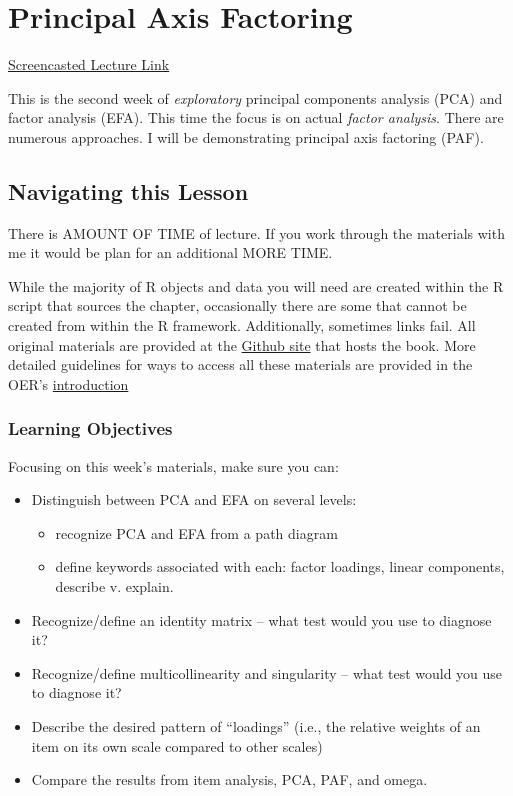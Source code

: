 \documentclass[
  english,
]{book}
\providecommand{\tightlist}{%
  \setlength{\itemsep}{0pt}\setlength{\parskip}{0pt}}
\begin{document}
\hypertarget{PAF}{%
\chapter{Principal Axis Factoring}\label{PAF}}

\href{link}{Screencasted Lecture Link}

This is the second week of \emph{exploratory} principal components analysis (PCA) and factor analysis (EFA). This time the focus is on actual \emph{factor analysis}. There are numerous approaches. I will be demonstrating principal axis factoring (PAF).

\hypertarget{navigating-this-lesson-7}{%
\section{Navigating this Lesson}\label{navigating-this-lesson-7}}

There is AMOUNT OF TIME of lecture. If you work through the materials with me it would be plan for an additional MORE TIME.

While the majority of R objects and data you will need are created within the R script that sources the chapter, occasionally there are some that cannot be created from within the R framework. Additionally, sometimes links fail. All original materials are provided at the \href{https://github.com/lhbikos/ReC_Psychometrics}{Github site} that hosts the book. More detailed guidelines for ways to access all these materials are provided in the OER's \protect\hyperlink{ReCintro}{introduction}

\hypertarget{learning-objectives-7}{%
\subsection{Learning Objectives}\label{learning-objectives-7}}

Focusing on this week's materials, make sure you can:

\begin{itemize}
\tightlist
\item
  Distinguish between PCA and EFA on several levels:

  \begin{itemize}
  \tightlist
  \item
    recognize PCA and EFA from a path diagram
  \item
    define keywords associated with each: factor loadings, linear components, describe v. explain.\\
  \end{itemize}
\item
  Recognize/define an identity matrix -- what test would you use to diagnose it?
\item
  Recognize/define multicollinearity and singularity -- what test would you use to diagnose it?
\item
  Describe the desired pattern of ``loadings'' (i.e., the relative weights of an item on its own scale compared to other scales)
\item
  Compare the results from item analysis, PCA, PAF, and omega.
\end{itemize}
\end{document}
